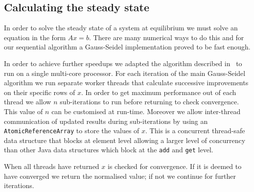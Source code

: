 \subsection{Calculating the steady state}
In order to solve the steady state of a system at equilibrium we must solve an equation in the form $Ax = b$. There are many numerical ways to do this and for our sequential algorithm a Gauss-Seidel implementation proved to be fast enough.

In order to achieve further speedups we adapted the algorithm described in~\cite{dingle2002distributed} to run on a single multi-core processor. For each iteration of the main Gauss-Seidel algorithm we run separate worker threads that calculate successive improvements on their specific rows of $x$. 
In order to get maximum performance out of each thread we allow $n$ sub-iterations to run before returning to check convergence. This value of $n$ can be customised at run-time.  Moreover we allow inter-thread communication of updated results during sub-iterations by using an \texttt{AtomicReferenceArray} to store the values of $x$. This is a concurrent thread-safe data structure that blocks at element level allowing a larger level of concurrency than other Java data structures which block at the \texttt{add} and \texttt{get} level.

When all threads have returned $x$ is checked for convergence. If it is deemed to have converged we return the normalised value; if not we continue for further iterations.